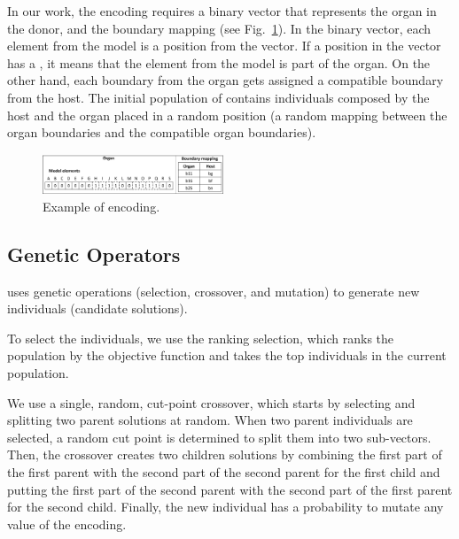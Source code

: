 In our work, the encoding requires a binary vector that represents the organ in the donor, and the boundary mapping (see Fig.~\ref{fig:encoding}). In the binary vector, each element from the model is a position from the vector. If a position in the vector has a , it means that the element from the model is part of the organ. On the other hand, each boundary from the organ gets assigned a compatible boundary from the host.
The initial population of \ApproachName{} contains individuals composed by the host and the organ placed in a random position (a random mapping between the organ boundaries and the compatible organ boundaries).

\begin{figure}[h]
    \centering
    \includegraphics[width=0.48\textwidth]{Figures/encoding.png}
    \caption{Example of encoding.}
    \label{fig:encoding}
\end{figure}

\subsection{Genetic Operators}

\ApproachName{} uses genetic operations (selection, crossover, and mutation) to generate new individuals (\ie candidate solutions). 

To select the individuals, we use the ranking selection, which ranks the population by the objective function and takes the top individuals in the current population.

We use a single, random, cut-point crossover, which starts by selecting and splitting two parent solutions at random. When two parent individuals are selected, a random cut point is determined to split them into two sub-vectors.
Then, the crossover creates two children solutions by combining the first part of the first parent with the second part of the second parent for the first child and putting the first part of the second parent with the second part of the first parent for the second child.
Finally, the new individual has a probability to mutate any value of the encoding. 

